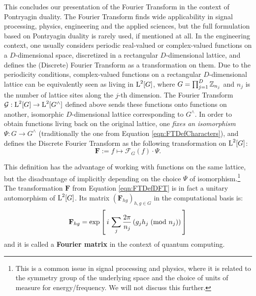 This concludes our presentation of the Fourier Transform in the context of Pontryagin duality. The Fourier Transform finds wide applicability in signal processing, physics, engineering and the applied sciences, but the full formulation based on Pontryagin duality is rarely used, if mentioned at all. In the engineering context, one usually considers periodic real-valued or complex-valued functions on a $D$-dimensional space, discretized in a rectangular $D$-dimensional lattice, and defines the (Discrete) Fourier Transform as a transformation on them. Due to the periodicity conditions, complex-valued functions on a rectangular $D$-dimensional lattice can be equivalently seen as living in $\operatorname{L}^2[G]$, where $G = \prod_{j=1}^D \mathbb{Z}_{n_j}$ and $n_j$ is the number of lattice sites along the $j$-th dimension. The  Fourier Transform $\mathcal{G} : \operatorname{L}^2[G] \rightarrow \operatorname{L}^2[G^\wedge]$ defined above sends these functions onto functions on another, isomorphic $D$-dimensional lattice corresponding to $G^\wedge$. In order to obtain functions living back on the original lattice, one \emph{fixes an isomorphism} $\Psi : G \rightarrow G^\wedge$ (traditionally the one from Equation \ref{eqn:FTDefCharacters}), and defines the Discrete Fourier Transform as the following transformation on $\operatorname{L}^2[G]$:
\begin{equation}\label{eqn:FTDefDFT}
  \mathbf{F} := f \mapsto \mathcal{F}_G(f) \cdot \Psi.
\end{equation}

This definition has the advantage of working with functions on the same lattice, but the disadvantage of implicitly depending on the choice $\Psi$ of isomorphism.\footnote{This is a common issue in signal processing and physics, where it is related to the symmetry group of the underlying space and the choice of units of measure for energy/frequency. We will not discuss this further.} The transformation $\mathbf{F}$ from Equation \ref{eqn:FTDefDFT} is in fact a unitary automorphism of $\operatorname{L}^2[G]$. Its matrix $(\mathbf{F}_{hg})_{h,g \in G}$ in the computational basis is:
\begin{equation} \label{eqn:HadamardMatrixDef}
  \mathbf{F}_{hg} = \exp\left[\, i \, \sum_j \frac{2 \pi}{n_j} \left(\modclass{g_jh_j}{n_j}\right) \, \right] %
\end{equation}
and it is called a \textbf{Fourier matrix} in the context of quantum computing.

